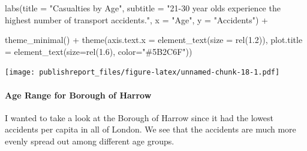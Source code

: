 \documentclass[
]{article}
\newenvironment{Shaded}{\begin{snugshade}}{\end{snugshade}}
\newcommand{\AttributeTok}[1]{\textcolor[rgb]{0.77,0.63,0.00}{#1}}
\newcommand{\FloatTok}[1]{\textcolor[rgb]{0.00,0.00,0.81}{#1}}
\newcommand{\FunctionTok}[1]{\textcolor[rgb]{0.00,0.00,0.00}{#1}}
\newcommand{\NormalTok}[1]{#1}
\newcommand{\SpecialCharTok}[1]{\textcolor[rgb]{0.00,0.00,0.00}{#1}}
\newcommand{\StringTok}[1]{\textcolor[rgb]{0.31,0.60,0.02}{#1}}
\begin{document}
\begin{Shaded}
\begin{Highlighting}[]
    \FunctionTok{labs}\NormalTok{(}\AttributeTok{title =} \StringTok{"Casualties by Age"}\NormalTok{,}
         \AttributeTok{subtitle =} \StringTok{"21{-}30 year olds experience the highest number of transport accidents."}\NormalTok{,}
         \AttributeTok{x =} \StringTok{"Age"}\NormalTok{,}
         \AttributeTok{y =} \StringTok{"Accidents"}\NormalTok{) }\SpecialCharTok{+}
    
    \FunctionTok{theme\_minimal}\NormalTok{() }\SpecialCharTok{+}
    \FunctionTok{theme}\NormalTok{(}\AttributeTok{axis.text.x =} \FunctionTok{element\_text}\NormalTok{(}\AttributeTok{size =} \FunctionTok{rel}\NormalTok{(}\FloatTok{1.2}\NormalTok{)),}
          \AttributeTok{plot.title =} \FunctionTok{element\_text}\NormalTok{(}\AttributeTok{size=}\FunctionTok{rel}\NormalTok{(}\FloatTok{1.6}\NormalTok{), }\AttributeTok{color=}\StringTok{"\#5B2C6F"}\NormalTok{))}
\end{Highlighting}
\end{Shaded}

\texttt{[image: publishreport\_files/figure-latex/unnamed-chunk-18-1.pdf]}

\hypertarget{age-range-for-borough-of-harrow}{%
\paragraph{Age Range for Borough of
Harrow}\label{age-range-for-borough-of-harrow}}

I wanted to take a look at the Borough of Harrow since it had the lowest
accidents per capita in all of London. We see that the accidents are
much more evenly spread out among different age groups.
\end{document}
